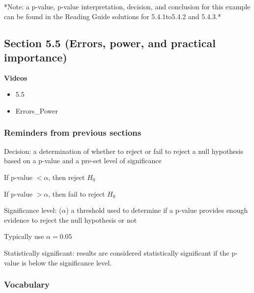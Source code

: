 \documentclass[
]{report}
\providecommand{\tightlist}{%
  \setlength{\itemsep}{0pt}\setlength{\parskip}{0pt}}
\newcommand{\rgi}{\hspace{24pt}}  %
\begin{document}
\rgi *Note: a p-value, p-value interpretation, decision, and conclusion for this example can be found in the Reading Guide solutions for 5.4.1to5.4.2 and 5.4.3.*

\hypertarget{section-5.5-errors-power-and-practical-importance}{%
\subsection*{Section 5.5 (Errors, power, and practical importance)}\label{section-5.5-errors-power-and-practical-importance}}


\textbf{Videos}

\begin{itemize}
\tightlist
\item
  5.5
\item
  Errors\_Power
\end{itemize}


\hypertarget{reminders-from-previous-sections-4}{%
\subsubsection*{Reminders from previous sections}\label{reminders-from-previous-sections-4}}

Decision: a determination of whether to reject or fail to reject a null hypothesis based on a p-value and a pre-set level of significance

\rgi If p-value \(< \alpha\), then reject \(H_0\)

\rgi If p-value \(> \alpha\), then fail to reject \(H_0\)

Significance level: (\(\alpha\)) a threshold used to determine if a p-value provides enough evidence to reject the null hypothesis or not

\rgi Typically use \(\alpha =0.05\)

Statistically significant: results are considered statistically significant if the p-value is below the significance level.

\hypertarget{vocabulary-16}{%
\subsubsection*{Vocabulary}\label{vocabulary-16}}
\end{document}
